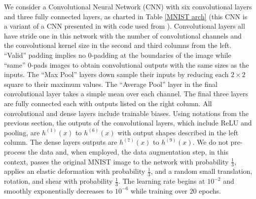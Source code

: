 \documentclass[11pt]{article}
\begin{document}
We consider a Convolutional Neural Network (CNN) with six convolutional layers and three fully connected layers, as charted in Table \ref{MNIST arch} (this CNN is a variant of a CNN presented in \cite{Kagglemnist} with code used from \cite{CNNTF}).  Convolutional layers all have stride one in this network with the number of convolutional channels and the convolutional kernel size in the second and third columns from the left.  ``Valid'' padding implies no 0-padding at the boundaries of the image while ``same'' 0-pads images to obtain convolutional outputs with the same sizes as the inputs.  The ``Max Pool'' layers down sample their inputs by reducing each $2 \times 2$ square to their maximum values.  The ``Average Pool'' layer in the final convolutional layer takes a simple mean over each channel.  The final three layers are fully connected each with outputs listed on the right column.  All convolutional and dense layers include trainable biases.  Using notations from the previous section, the outputs of the convolutional layers, which include ReLU and pooling, are  $h^{(1)}(x)$ to $h^{(6)}(x)$ with output shapes  described in the left column.  The dense layers outputs are  $h^{(7)}(x)$ to $h^{(9)}(x)$.  We do not pre-process the data and, when employed, the data augmentation step, in this context, passes the original MNIST image to the network with probability $\frac{1}{3}$, applies an elastic deformation \cite{elasticdef} with probability $\frac{1}{3}$, and a random small translation, rotation, and shear with probability $\frac{1}{3}$.  The learning rate begins at $10^{-2}$ and smoothly exponentially decreases to $10^{-6}$ while training over $20$ epochs.
\end{document}
